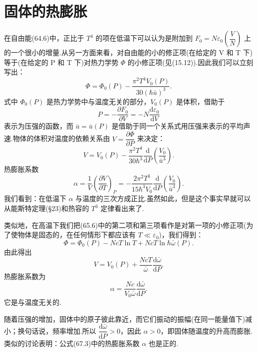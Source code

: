 \section{固体的热膨胀}

在自由能(64.6)中，正比于 $T^4$ 的项在低温下可以认为是附加到 $F_0=N\varepsilon_0\left(\dfrac{V}{N}\right)$ 上的一个很小的增量.从另一方面来看，对自由能的小的修正项(在给定的 V 和 T 下)等于(在给定的 P 和 T 下)对热力学势 $\Phi$ 的小修正项(见(15.12)).因此我们可以立刻写出：
\begin{equation}
  \Phi=\Phi_0(P)-\frac{\pi^2T^4V_0(P)}{30(\hbar\bar{u})^3}.
\end{equation}
式中 $\Phi_0(P)$ 是热力学势中与温度无关的部分，$V_0(P)$ 是体积，借助于
\begin{equation*}
  P=-\frac{\partial F_0}{\partial V}=-N\frac{\mathrm{d}\varepsilon_0}{\mathrm{d}V}
\end{equation*}
表示为压强的函数，而 $\bar{u}=\bar{u}(P)$ 是借助于同一个关系式用压强来表示的平均声速.物体的体积对温度的依赖关系由 $V=\dfrac{\partial\Phi}{\partial P}$ 来决定：
\begin{equation}
  V=V_0(P)-\frac{\pi^2T^4}{30\hbar^3}\frac{\mathrm{d}}{\mathrm{d}P}\left(\frac{V_0}{\bar{u}^3}\right).
\end{equation}
热膨胀系数
\begin{equation}
  \alpha=\frac{1}{V}\left(\frac{\partial V}{\partial T}\right)_P=-\frac{2\pi^2T^3}{15\hbar^3V_0}\frac{\mathrm{d}}{\mathrm{d}P}\left(\frac{V_0}{\bar{u}^3}\right).
\end{equation}
我们看到：在低温下 $\alpha$ 与温度的三次方成正比.虽然如此，但是这个事实早就可以从能斯特定理(§23)和热容的 $T^3$ 定律看出来了.

类似地，在高温下我们把(65.6)中的第二项和第三项看作是对第一项的小修正项(为了使物体是固态的，在任何情形下都应该有 $T\ll\varepsilon_0$)，我们得到：
\begin{equation}
  \Phi=\Phi_0(P)-NcT\ln T+NcT\ln\hbar\bar{\omega}(P).
\end{equation}
由此得出
\begin{equation}
  V=V_0(P)+\frac{NcT}{\bar{\omega}}\frac{\mathrm{d}\bar{\omega}}{\mathrm{d}P}.
\end{equation}
热膨胀系数为
\begin{equation}
  \alpha=\frac{Nc}{V_0\bar{\omega}}\frac{\mathrm{d}\bar{\omega}}{\mathrm{d}P}.
\end{equation}
它是与温度无关的.

随着压强的增加，固体中的原子彼此靠近，而它们振动的振幅(在同一能量值下)减小；换句话说，频率增加.所以 $\dfrac{\mathrm{d}\bar{\omega}}{\mathrm{d}P}>0$，因此 $\alpha>0$，即固体随温度的升高而膨胀.类似的讨论表明：公式(67.3)中的热膨胀系数 $\alpha$ 也是正的.

